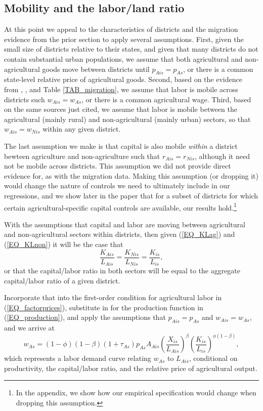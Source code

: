 \documentclass[11pt]{article}
\begin{document}
\subsection{Mobility and the labor/land ratio}
At this point we appeal to the characteristics of districts and the migration evidence from the prior section to apply several assumptions. First, given the small size of districts relative to their states, and given that many districts do not contain substantial urban populations, we assume that both agricultural and non-agricultural goods move between districts until $p_{Ais} = p_{As}$, or there is a common state-level relative price of agricultural goods. Second, based on the evidence from \cite{young2013inequality}, \cite{hklm2017}, and Table \ref{TAB_migration}, we assume that labor is mobile across districts such $w_{Ais} = w_{As}$, or there is a common agricultural wage. Third, based on the same sources just cited, we assume that labor is mobile between the agricultural (mainly rural) and non-agricultural (mainly urban) sectors, so that $w_{Ais} = w_{Nis}$ within any given district. 

The last assumption we make is that capital is also mobile \textit{within} a district bewteen agriculture and non-agriculture such that $r_{Ais} = r_{Nis}$, although it need not be mobile across districts. This assumption we did not provide direct evidence for, as with the migration data. Making this assumption (or dropping it) would change the nature of controls we need to ultimately include in our regressions, and we show later in the paper that for a subset of districts for which certain agricultural-specific capital controls are available, our results hold.\footnote{In the appendix, we show how our empirical specification would change when dropping this assumption.}

With the assumptions that capital and labor are moving between agricultural and non-agricultural sectors within districts, then given (\ref{EQ_KLag}) and (\ref{EQ_KLnon}) it will be the case that
\begin{equation*}
	\frac{K_{Ais}}{L_{Ais}} = \frac{K_{Nis}}{L_{Nis}} = \frac{K_{is}}{L_{is}},
\end{equation*}
or that the capital/labor ratio in both sectors will be equal to the aggregate capital/labor ratio of a given district.

Incorporate that into the first-order condition for agricultural labor in (\ref{EQ_factorprices}), substitute in for the production function in (\ref{EQ_production}), and apply the assumptions that $p_{Ais} = p_{As}$ and $w_{Ais} = w_{As}$, and we arrive at
\begin{equation}
	w_{As} = (1-\phi)(1-\beta) (1+\tau_{As}) p_{As} A_{Ais} \left(\frac{X_{is}}{L_{Ais}}\right)^{\beta} \left(\frac{K_{is}}{L_{is}}\right)^{\phi(1-\beta)}, \label{EQ_wAs}
\end{equation}
which represents a labor demand curve relating $w_{As}$ to $L_{Ais}$, conditional on productivity, the capital/labor ratio, and the relative price of agricultural output. 
\end{document}
